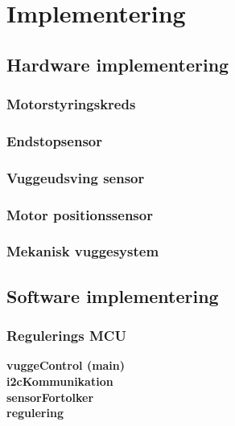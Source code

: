 \section{Implementering}
\subsection{Hardware implementering}

\subsubsection{Motorstyringskreds}

\subsubsection{Endstopsensor}
\label{Vuggesystem: Implementering_ES} 

\subsubsection{Vuggeudsving sensor}

\subsubsection{Motor positionssensor}

\subsubsection{Mekanisk vuggesystem}


\subsection{Software implementering}
\subsubsection{Regulerings MCU}
\textbf{vuggeControl (main)} \\
\textbf{i2cKommunikation} \\
\textbf{sensorFortolker} \\
\textbf{regulering} \\

